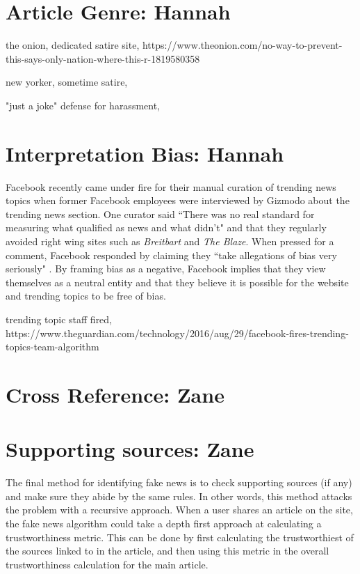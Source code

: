 \documentclass[12pt]{article}
\begin{document}
\section{Article Genre: Hannah}

the onion, dedicated satire site, https://www.theonion.com/no-way-to-prevent-this-says-only-nation-where-this-r-1819580358

new yorker, sometime satire, 

"just a joke" defense for harassment, 



\section{Interpretation Bias: Hannah}
Facebook recently came under fire for their manual curation of trending news topics when former Facebook employees were interviewed by Gizmodo about the trending news section. One curator said ``There was no real standard for measuring what qualified as news and what didn't" and that they regularly avoided right wing sites such as \textit{Breitbart} and \textit{The Blaze}. When pressed for a comment, Facebook responded by claiming they ``take allegations of bias very seriously" \citep{gizmodo_fb_news_curation}. By framing bias as a negative, Facebook implies that they view themselves as a neutral entity and that they believe it is possible for the website and trending topics to be free of bias.


trending topic staff fired, https://www.theguardian.com/technology/2016/aug/29/facebook-fires-trending-topics-team-algorithm



\section{Cross Reference: Zane}



\section{Supporting sources: Zane}
The final method for identifying fake news is to check supporting sources (if any) and make sure they abide by the same rules. In other words, this method attacks the problem with a recursive approach. When a user shares an article on the site, the fake news algorithm could take a depth first approach at calculating a trustworthiness metric. This can be done by first calculating the trustworthiest of the sources linked to in the article, and then using this metric in the overall trustworthiness calculation for the main article. 
\end{document}
